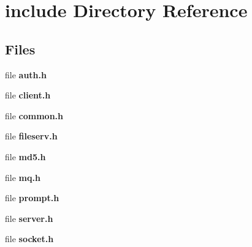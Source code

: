\section{include Directory Reference}
\label{dir_d44c64559bbebec7f509842c48db8b23}
\subsection*{Files}
\begin{DoxyCompactItemize}
\item 
file \textbf{ auth.\+h}
\item 
file \textbf{ client.\+h}
\item 
file \textbf{ common.\+h}
\item 
file \textbf{ fileserv.\+h}
\item 
file \textbf{ md5.\+h}
\item 
file \textbf{ mq.\+h}
\item 
file \textbf{ prompt.\+h}
\item 
file \textbf{ server.\+h}
\item 
file \textbf{ socket.\+h}
\end{DoxyCompactItemize}
